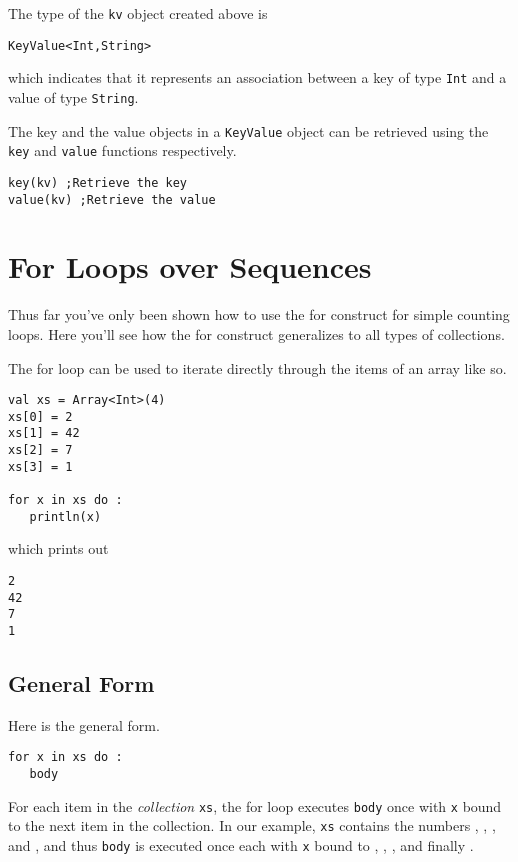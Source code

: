 \documentclass[10pt,oneside]{book}
\begin{document}
The type of the \texttt{\frenchspacing kv} object created above is
\begin{lstlisting}
KeyValue<Int,String>
\end{lstlisting}
which indicates that it represents an association between a key of type \texttt{\frenchspacing Int} and a value of type \texttt{\frenchspacing String}.

The key and the value objects in a \texttt{\frenchspacing KeyValue} object can be retrieved using the \texttt{\frenchspacing key} and \texttt{\frenchspacing value} functions respectively.
\begin{lstlisting}
key(kv) ;Retrieve the key
value(kv) ;Retrieve the value
\end{lstlisting}

\section{For Loops over Sequences}
Thus far you've only been shown how to use the for construct for simple counting loops. Here you'll see how the for construct generalizes to all types of collections.

The for loop can be used to iterate directly through the items of an array like so.
\begin{lstlisting}
val xs = Array<Int>(4)
xs[0] = 2
xs[1] = 42
xs[2] = 7
xs[3] = 1

for x in xs do :
   println(x)
\end{lstlisting}
which prints out
\begin{lstlisting}
2
42
7
1
\end{lstlisting}

\subsection*{General Form}
Here is the general form.
\begin{lstlisting}
for x in xs do :
   body
\end{lstlisting}
For each item in the {\em collection} \texttt{\frenchspacing xs}, the for loop executes \texttt{\frenchspacing body} once with \texttt{\frenchspacing x} bound to the next item in the collection. In our example, \texttt{\frenchspacing xs} contains the numbers \texttt{}, \texttt{}, \texttt{}, and \texttt{}, and thus \texttt{\frenchspacing body} is executed once each with \texttt{\frenchspacing x} bound to \texttt{}, \texttt{}, \texttt{}, and finally \texttt{}. 
\end{document}
